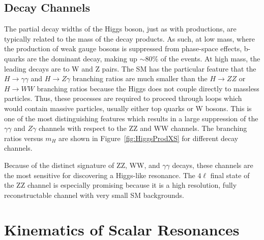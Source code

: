 \subsection{Decay Channels}
\label{sec:HiggsDecays}

The partial decay widths of the Higgs boson, just as with productions, are typically related to the mass of the decay products.  As such, at low 
mass, where the production of weak gauge bosons is suppressed from 
phase-space effects, b-quarks are the dominant decay, making up $\sim80\%$ of 
the events.  At high mass, the leading decays are to W and Z pairs.  
The SM has the particular feature that the $H\to\gamma\gamma$ and 
$H\to Z\gamma$ branching ratios are much smaller than the $H\to ZZ$ or 
$H\to WW$ branching ratios
because the Higgs does not couple directly to massless particles.  Thus, these
processes are required to proceed through loops which would contain massive
particles, usually either top quarks or W bosons.  This is one of the 
most distinguishing features which results in a large suppression of 
the $\gamma\gamma$ and $Z\gamma$ channels with respect to the ZZ and WW
channels.  The branching ratios versus $m_H$ are shown in 
Figure~\ref{fig:HiggsProdXS} for different decay channels. 

Because of the distinct signature of ZZ,
WW, and $\gamma\gamma$ decays, these channels are the most sensitive for 
discovering a Higgs-like resonance.  The $4\ell$ final state of the ZZ 
channel is especially promising because it is a high resolution, fully 
reconstructable channel with very small SM backgrounds.


\section{Kinematics of Scalar Resonances}
\label{sec:Kinematics of scalar resonances}


